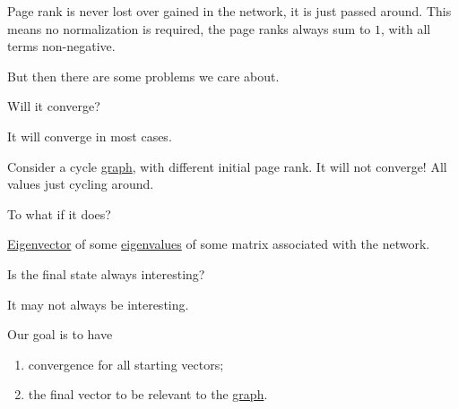 \begin{note}
	Page rank is never lost over gained in the network, it is just passed around. This means no normalization is required, the page ranks always sum to \(1\), with all terms non-negative.
\end{note}

But then there are some problems we care about.
\begin{problem}
Will it converge?
\end{problem}
\begin{answer}
	It will converge in most cases.
\end{answer}

\begin{eg}
	Consider a cycle \hyperref[def:graph]{graph}, with different initial page rank. It will not converge! All values just cycling around.
\end{eg}

\begin{problem}
To what if it does?
\end{problem}
\begin{answer}
	\hyperref[def:eigenvector]{Eigenvector} of some \hyperref[def:eigenvalue]{eigenvalues} of some matrix associated with the network.
\end{answer}

\begin{problem}
Is the final state always interesting?
\end{problem}
\begin{answer}
	It may not always be interesting.
\end{answer}

Our goal is to have
\begin{enumerate}
	\item convergence for all starting vectors;
	\item the final vector to be relevant to the \hyperref[def:graph]{graph}.
\end{enumerate}

